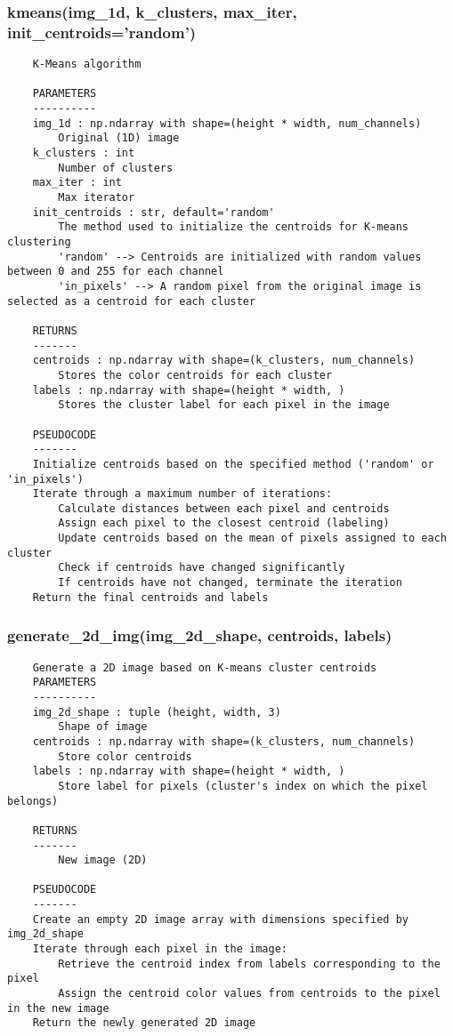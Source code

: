 \subsubsection{kmeans(img\_1d, k\_clusters, max\_iter, init\_centroids='random')}
\begin{verbatim}
    K-Means algorithm

    PARAMETERS
    ----------
    img_1d : np.ndarray with shape=(height * width, num_channels)
        Original (1D) image
    k_clusters : int
        Number of clusters
    max_iter : int
        Max iterator
    init_centroids : str, default='random'
        The method used to initialize the centroids for K-means clustering
        'random' --> Centroids are initialized with random values between 0 and 255 for each channel
        'in_pixels' --> A random pixel from the original image is selected as a centroid for each cluster

    RETURNS
    -------
    centroids : np.ndarray with shape=(k_clusters, num_channels)
        Stores the color centroids for each cluster
    labels : np.ndarray with shape=(height * width, )
        Stores the cluster label for each pixel in the image

    PSEUDOCODE
    -------
    Initialize centroids based on the specified method ('random' or 'in_pixels')
    Iterate through a maximum number of iterations:
        Calculate distances between each pixel and centroids
        Assign each pixel to the closest centroid (labeling)
        Update centroids based on the mean of pixels assigned to each cluster
        Check if centroids have changed significantly
        If centroids have not changed, terminate the iteration
    Return the final centroids and labels
\end{verbatim}
\subsubsection{generate\_2d\_img(img\_2d\_shape, centroids, labels)}
\begin{verbatim}
    Generate a 2D image based on K-means cluster centroids
    PARAMETERS
    ----------
    img_2d_shape : tuple (height, width, 3)
        Shape of image
    centroids : np.ndarray with shape=(k_clusters, num_channels)
        Store color centroids
    labels : np.ndarray with shape=(height * width, )
        Store label for pixels (cluster's index on which the pixel belongs)

    RETURNS
    -------
        New image (2D)

    PSEUDOCODE
    -------
    Create an empty 2D image array with dimensions specified by img_2d_shape
    Iterate through each pixel in the image:
        Retrieve the centroid index from labels corresponding to the pixel
        Assign the centroid color values from centroids to the pixel in the new image
    Return the newly generated 2D image
\end{verbatim}

